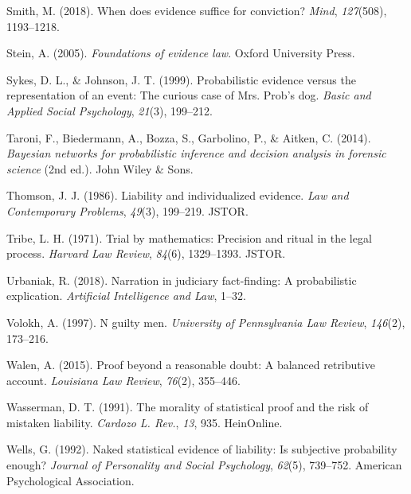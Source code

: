 \documentclass[10pt,dvipsnames,enabledeprecatedfontcommands]{scrartcl}
\begin{document}
\leavevmode\hypertarget{ref-smith2017}{}%
Smith, M. (2018). When does evidence suffice for conviction?
\emph{Mind}, \emph{127}(508), 1193--1218.

\leavevmode\hypertarget{ref-Stein05}{}%
Stein, A. (2005). \emph{Foundations of evidence law}. Oxford University
Press.

\leavevmode\hypertarget{ref-sykes1999}{}%
Sykes, D. L., \& Johnson, J. T. (1999). Probabilistic evidence versus
the representation of an event: The curious case of Mrs. Prob's dog.
\emph{Basic and Applied Social Psychology}, \emph{21}(3), 199--212.

\leavevmode\hypertarget{ref-taroni2006bayesian}{}%
Taroni, F., Biedermann, A., Bozza, S., Garbolino, P., \& Aitken, C.
(2014). \emph{Bayesian networks for probabilistic inference and decision
analysis in forensic science} (2nd ed.). John Wiley \& Sons.

\leavevmode\hypertarget{ref-thomson1986liability}{}%
Thomson, J. J. (1986). Liability and individualized evidence. \emph{Law
and Contemporary Problems}, \emph{49}(3), 199--219. JSTOR.

\leavevmode\hypertarget{ref-tribe1971trial}{}%
Tribe, L. H. (1971). Trial by mathematics: Precision and ritual in the
legal process. \emph{Harvard Law Review}, \emph{84}(6), 1329--1393.
JSTOR.

\leavevmode\hypertarget{ref-urbaniak2018narration}{}%
Urbaniak, R. (2018). Narration in judiciary fact-finding: A
probabilistic explication. \emph{Artificial Intelligence and Law},
1--32.

\leavevmode\hypertarget{ref-voloch1997}{}%
Volokh, A. (1997). N guilty men. \emph{University of Pennsylvania Law
Review}, \emph{146}(2), 173--216.

\leavevmode\hypertarget{ref-walen2015}{}%
Walen, A. (2015). Proof beyond a reasonable doubt: A balanced
retributive account. \emph{Louisiana Law Review}, \emph{76}(2),
355--446.

\leavevmode\hypertarget{ref-wasserman1991morality}{}%
Wasserman, D. T. (1991). The morality of statistical proof and the risk
of mistaken liability. \emph{Cardozo L. Rev.}, \emph{13}, 935.
HeinOnline.

\leavevmode\hypertarget{ref-wells1992naked}{}%
Wells, G. (1992). Naked statistical evidence of liability: Is subjective
probability enough? \emph{Journal of Personality and Social Psychology},
\emph{62}(5), 739--752. American Psychological Association.
\end{document}
